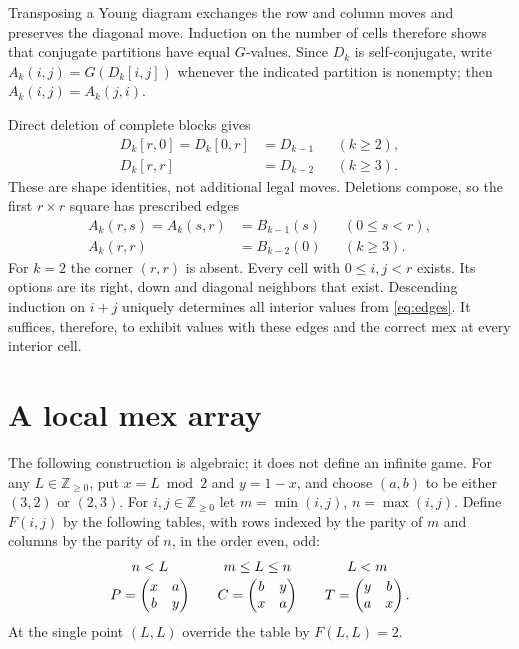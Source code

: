 \documentclass[11pt]{article}
\theoremstyle{remark}
\newcommand{\N}{\mathbb{Z}_{\geq0}}
\begin{document}
Transposing a Young diagram exchanges the row and column moves and
preserves the diagonal move. Induction on the number of cells therefore
shows that conjugate partitions have equal $G$-values. Since $D_k$ is
self-conjugate, write $A_k(i,j)=G(D_k[i,j])$ whenever the indicated
partition is nonempty; then $A_k(i,j)=A_k(j,i)$.

Direct deletion of complete blocks gives
\begin{equation}\label{eq:shapes}
\begin{aligned}
 D_k[r,0]=D_k[0,r]&=D_{k-1}&& (k\geq2),\\
 D_k[r,r]&=D_{k-2}&& (k\geq3).
\end{aligned}
\end{equation}
These are shape identities, not additional legal moves. Deletions compose,
so the first $r\times r$ square has prescribed edges
\begin{equation}\label{eq:edges}
\begin{aligned}
 A_k(r,s)=A_k(s,r)&=B_{k-1}(s)&& (0\leq s<r),\\
 A_k(r,r)&=B_{k-2}(0)&& (k\geq3).
\end{aligned}
\end{equation}
For $k=2$ the corner $(r,r)$ is absent. Every cell with $0\leq i,j<r$
exists. Its options are its right, down and diagonal neighbors that
exist. Descending induction on $i+j$ uniquely determines all interior
values from \eqref{eq:edges}. It suffices, therefore, to exhibit values
with these edges and the correct mex at every interior cell.

\section{A local mex array}

The following construction is algebraic; it does not define an infinite
game. For any $L\in\N$, put $x=L\bmod2$ and $y=1-x$, and choose
$(a,b)$ to be either $(3,2)$ or $(2,3)$. For $i,j\in\N$ let
$m=\min(i,j)$, $n=\max(i,j)$. Define $F(i,j)$ by the following tables,
with rows indexed by the parity of $m$ and columns by the parity of $n$,
in the order even, odd:
\begin{equation}\label{eq:array}
\begin{array}{c@{\qquad}c@{\qquad}c}
 n<L&m\leq L\leq n&L<m\\[2pt]
 P=\begin{pmatrix}x&a\\b&y\end{pmatrix}&
 C=\begin{pmatrix}b&y\\x&a\end{pmatrix}&
 T=\begin{pmatrix}y&b\\a&x\end{pmatrix}.
\end{array}
\end{equation}
At the single point $(L,L)$ override the table by $F(L,L)=2$.
\end{document}
